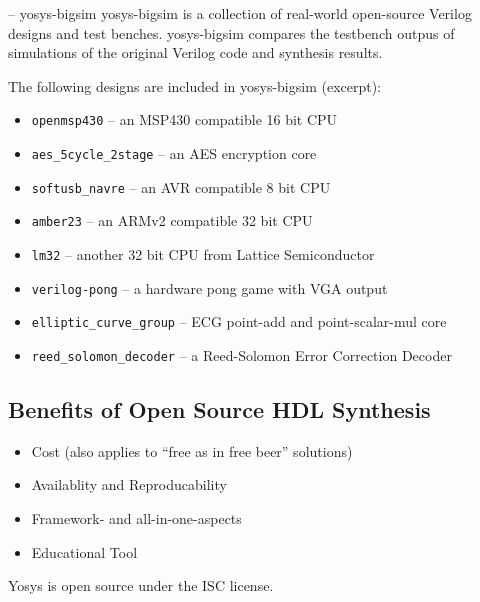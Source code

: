 \begin{frame}{\subsecname{} -- yosys-bigsim}
yosys-bigsim is a collection of real-world open-source Verilog designs and test
benches. yosys-bigsim compares the testbench outpus of simulations of the original
Verilog code and synthesis results.

\bigskip
The following designs are included in yosys-bigsim (excerpt):
\begin{itemize}
\item {\tt openmsp430} -- an MSP430 compatible 16 bit CPU
\item {\tt aes\_5cycle\_2stage} -- an AES encryption core
\item {\tt softusb\_navre} -- an AVR compatible 8 bit CPU
\item {\tt amber23} -- an ARMv2 compatible 32 bit CPU
\item {\tt lm32} -- another 32 bit CPU from Lattice Semiconductor
\item {\tt verilog-pong} -- a hardware pong game with VGA output
\item {\tt elliptic\_curve\_group} -- ECG point-add and point-scalar-mul core
\item {\tt reed\_solomon\_decoder} -- a Reed-Solomon Error Correction Decoder
\end{itemize}
\end{frame}


\subsection{Benefits of Open Source HDL Synthesis}

\begin{frame}{\subsecname}
\begin{itemize}
\item Cost (also applies to ``free as in free beer'' solutions)
\item Availablity and Reproducability
\item Framework- and all-in-one-aspects
\item Educational Tool
\end{itemize}

\bigskip

Yosys is open source under the ISC license.
\end{frame}


